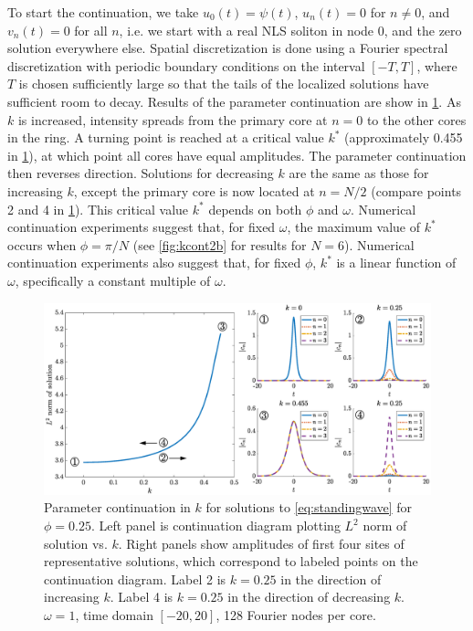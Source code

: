 \documentclass[11pt,reqno]{amsart}
\begin{document}
To start the continuation, we take $u_0(t) = \psi(t)$, $u_n(t) = 0$ for $n \neq 0$, and $v_n(t) = 0$ for all $n$, i.e. we start with a real NLS soliton in node 0, and the zero solution everywhere else. Spatial discretization is done using a Fourier spectral discretization with periodic boundary conditions on the interval $[-T,T]$, where $T$ is chosen sufficiently large so that the tails of the localized solutions have sufficient room to decay. Results of the parameter continuation are show in \cref{fig:kcont}. As $k$ is increased, intensity spreads from the primary core at $n=0$ to the other cores in the ring. A turning point is reached at a critical value $k^*$ (approximately 0.455 in \cref{fig:kcont}), at which point all cores have equal amplitudes. The parameter continuation then reverses direction. Solutions for decreasing $k$ are the same as those for increasing $k$, except the primary core is now located at $n=N/2$ (compare points 2 and 4 in \cref{fig:kcont}). This critical value $k^*$ depends on both $\phi$ and $\omega$. Numerical continuation experiments suggest that, for fixed $\omega$, the maximum value of $k^*$ occurs when $\phi = \pi/N$ (see \cref{fig:kcont2b} for results for $N=6$). Numerical continuation experiments also suggest that, for fixed $\phi$, $k^*$ is a linear function of $\omega$, specifically a constant multiple of $\omega$.

\begin{figure}
    \centering
    \includegraphics[width=16cm]{contdiag.eps}
    \caption{Parameter continuation in $k$ for solutions to \cref{eq:standingwave} for $\phi=0.25$. Left panel is continuation diagram plotting $L^2$ norm of solution vs. $k$. Right panels show amplitudes of first four sites of representative solutions, which correspond to labeled points on the continuation diagram. Label 2 is $k=0.25$ in the direction of increasing $k$. Label 4 is $k=0.25$ in the direction of decreasing $k$. $\omega=1$, time domain $[-20,20]$, 128 Fourier nodes per core.}
    \label{fig:kcont}
\end{figure}
\end{document}
